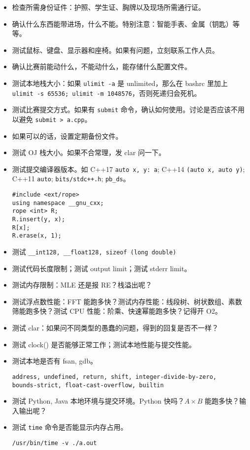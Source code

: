 
\begin{itemize}
    \setlength{\itemsep}{0pt}
    \setlength{\parskip}{1pt}
    \item 检查所需身份证件：护照、学生证、胸牌以及现场所需通行证。
    \item 确认什么东西能带进场，什么不能。特别注意：智能手表、金属（钥匙）等等。
    \item 测试鼠标、键盘、显示器和座椅。如果有问题，立刻联系工作人员。
    \item 确认比赛前能动什么，不能动什么，能存储什么配置文件。
    \item 测试本地栈大小：如果 \texttt{ulimit -a} 是 unlimited，那么在 bashrc 里加上 \texttt{ulimit -s 65536; ulimit -m 1048576}，否则死递归会死机。
    \item 测试比赛提交方式。如果有 \texttt{submit} 命令，确认如何使用。讨论是否应该不用以避免 \texttt{submit > a.cpp}。
    \item 如果可以的话，设置定期备份文件。
    \item 测试 OJ 栈大小。如果不合常理，发 clar 问一下。
    \item 测试提交编译器版本。如 C++17 \texttt{auto \lbrack x, y\rbrack : a}; C++14 \texttt{\lbrack \rbrack (auto x, auto y)}; C++11 \texttt{auto}; \texttt{bits/stdc++.h}; \texttt{pb\_ds}。
\begin{verbatim}
#include <ext/rope>
using namespace __gnu_cxx;
rope <int> R;
R.insert(y, x);
R[x];
R.erase(x, 1);
\end{verbatim}
    \item 测试 \texttt{\_\_int128, \_\_float128, sizeof (long double)}
    \item 测试代码长度限制；测试 output limit；测试 stderr limit。
    \item 测试内存限制：MLE 还是报 RE？栈溢出呢？
    \item 测试浮点数性能：FFT 能跑多快？测试内存性能：线段树、树状数组、素数筛能跑多快？测试 CPU 性能：阶乘、快速幂能跑多快？记得开 O2。
    \item 测试 clar：如果问不同类型的愚蠢的问题，得到的回复是否不一样？
    \item 测试 clock() 是否能够正常工作；测试本地性能与提交性能。
    \item 测试本地是否有 fsan, gdb。\begin{verbatim}
address, undefined, return, shift, integer-divide-by-zero,
bounds-strict, float-cast-overflow, builtin
\end{verbatim}
    \item 测试 Python, Java 本地环境与提交环境。Python 快吗？$A\times B$ 能跑多快？输入输出呢？
    \item 测试 \texttt{time} 命令是否能显示内存占用。
\begin{verbatim}
/usr/bin/time -v ./a.out
\end{verbatim}
\end{itemize}
